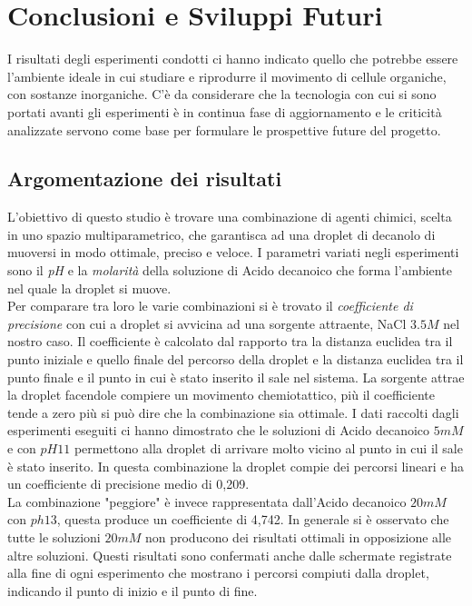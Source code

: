 \chapter{Conclusioni e Sviluppi Futuri}
\vspace{0.5cm}
\label{cha:789}
I risultati degli esperimenti condotti ci hanno indicato quello che potrebbe essere l'ambiente ideale in cui studiare e riprodurre il movimento di cellule organiche, con sostanze inorganiche. C'è da considerare che la tecnologia con cui si sono portati avanti gli esperimenti è in continua fase di aggiornamento e le criticità analizzate servono come base per formulare le prospettive future del progetto.

\section{Argomentazione dei risultati}
L'obiettivo di questo studio è trovare una combinazione di agenti chimici, scelta in uno spazio multiparametrico, che garantisca ad una droplet di decanolo di muoversi in modo ottimale, preciso e veloce. I parametri variati negli esperimenti sono il \emph{pH} e la \emph{molarità} della soluzione di Acido decanoico che forma l'ambiente nel quale la droplet si muove.
\\Per comparare tra loro le varie combinazioni si è trovato il \emph{coefficiente di precisione} con cui a droplet si avvicina ad una sorgente attraente, NaCl $3.5M$ nel nostro caso. Il coefficiente è calcolato dal rapporto tra la distanza euclidea tra il punto iniziale e quello finale del percorso della droplet e la distanza euclidea tra il punto finale e il punto in cui è stato inserito il sale nel sistema. La sorgente attrae la droplet facendole compiere un movimento chemiotattico, più il coefficiente tende a zero più si può dire che la combinazione sia ottimale. 
I dati raccolti dagli esperimenti eseguiti ci hanno dimostrato che le soluzioni di Acido decanoico $5mM$ e con $pH11$ permettono alla droplet di arrivare molto vicino al punto in cui il sale è stato inserito. In questa combinazione la droplet compie dei percorsi lineari e ha un coefficiente di precisione medio di 0,209.
\\La combinazione "peggiore" è invece rappresentata dall'Acido decanoico $20mM$ con $ph13$, questa produce un coefficiente di 4,742. In generale si è osservato che tutte le soluzioni $20mM$ non producono dei risultati ottimali in opposizione alle altre soluzioni. Questi risultati sono confermati anche dalle schermate registrate alla fine di ogni esperimento che mostrano i percorsi compiuti dalla droplet, indicando il punto di inizio e il punto di fine.   

